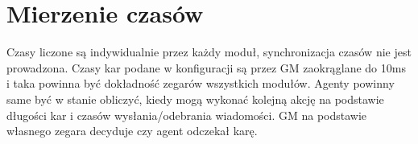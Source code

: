 \documentclass[Dokumentacja.tex]{subfiles}
\begin{document}
\section{Mierzenie czasów}
Czasy liczone są indywidualnie przez każdy moduł,
synchronizacja czasów nie jest prowadzona.
Czasy kar podane w konfiguracji są przez GM zaokrąglane do 10ms i taka powinna być dokładność
zegarów wszystkich modułów.
Agenty powinny same być w stanie obliczyć, kiedy mogą wykonać
kolejną akcję na podstawie długości kar i czasów wysłania/odebrania wiadomości.
GM na podstawie własnego zegara decyduje czy agent odczekał karę.
\end{document}
